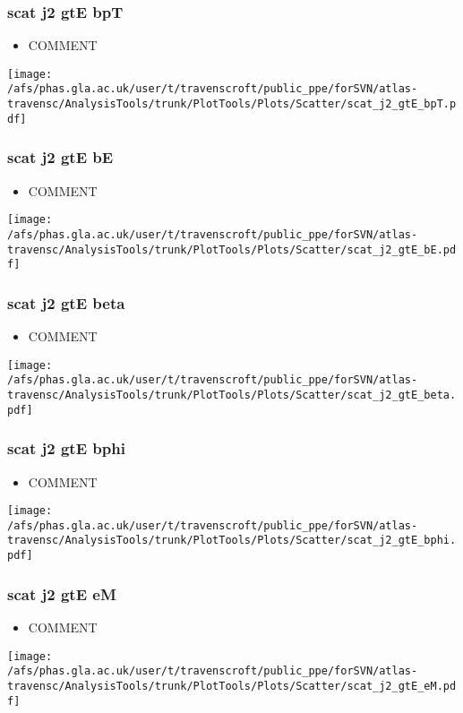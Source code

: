 \documentclass{beamer}
\begin{document}
\begin{frame}
\frametitle{scat j2 gtE bpT}
\begin{itemize}
\item COMMENT
\end{itemize}
\begin{center}
\texttt{[image: /afs/phas.gla.ac.uk/user/t/travenscroft/public\_ppe/forSVN/atlas-travensc/AnalysisTools/trunk/PlotTools/Plots/Scatter/scat\_j2\_gtE\_bpT.pdf]}
\end{center}
\end{frame}

\begin{frame}
\frametitle{scat j2 gtE bE}
\begin{itemize}
\item COMMENT
\end{itemize}
\begin{center}
\texttt{[image: /afs/phas.gla.ac.uk/user/t/travenscroft/public\_ppe/forSVN/atlas-travensc/AnalysisTools/trunk/PlotTools/Plots/Scatter/scat\_j2\_gtE\_bE.pdf]}
\end{center}
\end{frame}

\begin{frame}
\frametitle{scat j2 gtE beta}
\begin{itemize}
\item COMMENT
\end{itemize}
\begin{center}
\texttt{[image: /afs/phas.gla.ac.uk/user/t/travenscroft/public\_ppe/forSVN/atlas-travensc/AnalysisTools/trunk/PlotTools/Plots/Scatter/scat\_j2\_gtE\_beta.pdf]}
\end{center}
\end{frame}

\begin{frame}
\frametitle{scat j2 gtE bphi}
\begin{itemize}
\item COMMENT
\end{itemize}
\begin{center}
\texttt{[image: /afs/phas.gla.ac.uk/user/t/travenscroft/public\_ppe/forSVN/atlas-travensc/AnalysisTools/trunk/PlotTools/Plots/Scatter/scat\_j2\_gtE\_bphi.pdf]}
\end{center}
\end{frame}

\begin{frame}
\frametitle{scat j2 gtE eM}
\begin{itemize}
\item COMMENT
\end{itemize}
\begin{center}
\texttt{[image: /afs/phas.gla.ac.uk/user/t/travenscroft/public\_ppe/forSVN/atlas-travensc/AnalysisTools/trunk/PlotTools/Plots/Scatter/scat\_j2\_gtE\_eM.pdf]}
\end{center}
\end{frame}
\end{document}
